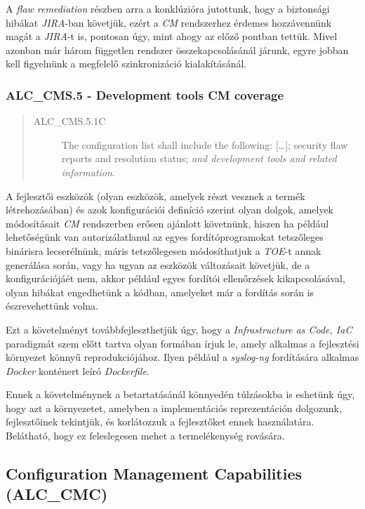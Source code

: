 A \emph{flaw remediation} részben arra a konklúzióra jutottunk, hogy a biztonsági hibákat
\emph{JIRA}-ban \cite{JIRA} követjük, ezért a \emph{CM} rendszerhez érdemes hozzávennünk magát
a \emph{JIRA}-t is, pontosan úgy, mint ahogy az előző pontban tettük. Mivel azonban már három
független rendszer összekapcsolásánál járunk, egyre jobban kell figyelnünk a megfelelő
szinkronizáció kialakításánál.

\pagebreak[3]
\subsubsection{ALC\_CMS.5 - Development tools CM coverage}
\begin{quote}
    \begin{description}
        \item[ALC\_CMS.5.1C]{The configuration list shall include the following: [\ldots]; security
            flaw reports and resolution status; \emph{and development tools and related
            information}.}
    \end{description}
\end{quote}

A fejlesztői eszközök (olyan eszközök, amelyek részt vesznek a termék létrehozásában) és azok
konfigurációi definíció szerint olyan dolgok, amelyek módosításait \emph{CM} rendszerben erősen
ajánlott követnünk, hiszen ha például lehetőségünk van autorizálatlanul az egyes fordítóprogramokat
tetszőleges binárisra lecserélnünk, máris tetszőlegesen módosíthatjuk a \emph{TOE}-t annak
generálása során, vagy ha ugyan az eszközök változásait követjük, de a konfigurációjáét nem, akkor
például egyes fordítói ellenőrzések kikapcsolásával, olyan hibákat engedhetünk a kódban, amelyeket
már a fordítás során is észrevehettünk volna.

Ezt a követelményt továbbfejleszthetjük úgy, hogy a \emph{Infrastructure as Code, IaC} paradigmát
szem előtt tartva olyan formában írjuk le, amely alkalmas a fejlesztési környezet könnyű
reprodukciójához. Ilyen például a \emph{syslog-ng} fordítására alkalmas \emph{Docker} konténert
leíró \emph{Dockerfile}. \cite{syslogngenv}

Ennek a követelménynek a betartatásánál könnyedén túlzásokba is eshetünk úgy, hogy azt
a környezetet, amelyben a implementációs reprezentáción dolgozunk, fejlesztőinek tekintjük, és
korlátozzuk a fejlesztőket ennek használatára. Belátható, hogy ez feleslegesen mehet
a termelékenység rovására.

\pagebreak[3]
\subsection{Configuration Management Capabilities (ALC\_CMC)}

